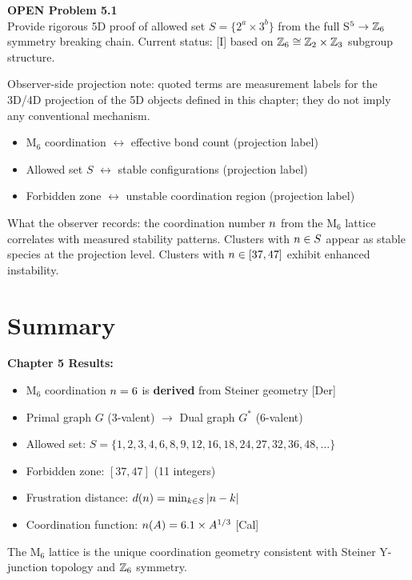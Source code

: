 \begin{edcopenbox}
    \textbf{OPEN Problem 5.1} \tagOPEN \\
    Provide rigorous 5D proof of allowed set $S = \{2^a \times 3^b\}$ from the
    full S$^5 \to \mathbb{Z}_6$ symmetry breaking chain. Current status: [I] based on
    $\mathbb{Z}_6 \cong \mathbb{Z}_2 \times \mathbb{Z}_3$ subgroup structure.
\end{edcopenbox}


\begin{observerbox}
Observer-side projection note: quoted terms are measurement labels for the
3D/4D projection of the 5D objects defined in this chapter; they do not
imply any conventional mechanism.

\begin{itemize}
    \item M$_6$ coordination $\leftrightarrow$ effective bond count (projection label)
    \item Allowed set $S$ $\leftrightarrow$ stable configurations (projection label)
    \item Forbidden zone $\leftrightarrow$ unstable coordination region (projection label)
\end{itemize}

What the observer records: the coordination number $n$ from the
M$_6$ lattice correlates with measured stability patterns. Clusters
with $n \in S$ appear as stable species at the projection level.
Clusters with $n \in [37, 47]$ exhibit enhanced instability.
\end{observerbox}

\section{Summary}
\label{sec:M6:summary}

\begin{resultbox}
\textbf{Chapter 5 Results:}
\begin{itemize}
    \item M$_6$ coordination $n = 6$ is \textbf{derived} from Steiner geometry [Der]
    \item Primal graph $G$ (3-valent) $\to$ Dual graph $G^*$ (6-valent)
    \item Allowed set: $S = \{1, 2, 3, 4, 6, 8, 9, 12, 16, 18, 24, 27, 32, 36, 48, \ldots\}$
    \item Forbidden zone: $[37, 47]$ (11 integers)
    \item Frustration distance: $d(n) = \min_{k \in S} |n - k|$
    \item Coordination function: $n(A) = 6.1 \times A^{1/3}$ [Cal]
\end{itemize}
The M$_6$ lattice is the unique coordination geometry consistent with
Steiner Y-junction topology and $\mathbb{Z}_6$ symmetry.
\end{resultbox}


